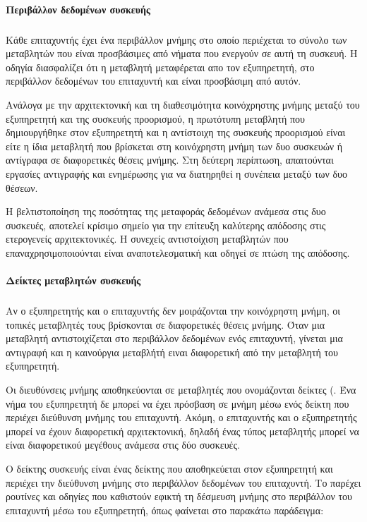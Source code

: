 \paragraph{Περιβάλλον δεδομένων συσκευής}
\subparagraph{}
Κάθε επιταχυντής έχει ένα περιβάλλον μνήμης στο οποίο περιέχεται το σύνολο των μεταβλητών που είναι προσβάσιμες από νήματα που ενεργούν σε αυτή τη συσκευή. Η οδηγία \emph{} διασφαλίζει ότι η μεταβλητή μεταφέρεται απο τον εξυπηρετητή, στο περιβάλλον δεδομένων του επιταχυντή και είναι προσβάσιμη από αυτόν.

Ανάλογα με την αρχιτεκτονική και τη διαθεσιμότητα κοινόχρηστης μνήμης μεταξύ του εξυπηρετητή \emph{} και της συσκευής προορισμού, η πρωτότυπη μεταβλητή που δημιουργήθηκε στον εξυπηρετητή και η αντίστοιχη της συσκευής προορισμού είναι είτε η ίδια μεταβλητή που βρίσκεται στη κοινόχρηστη μνήμη των δυο συσκευών ή αντίγραφα σε διαφορετικές θέσεις μνήμης. Στη δεύτερη περίπτωση, απαιτούνται εργασίες αντιγραφής και ενημέρωσης για να διατηρηθεί η συνέπεια μεταξύ των δυο θέσεων.

Η βελτιστοποίηση της ποσότητας της μεταφοράς δεδομένων ανάμεσα στις δυο συσκευές, αποτελεί κρίσιμο σημείο για την επίτευξη καλύτερης απόδοσης στις ετερογενείς αρχιτεκτονικές.
Η συνεχείς αντιστοίχιση μεταβλητών που επαναχρησιμοποιούνται είναι αναποτελεσματική και οδηγεί σε πτώση της απόδοσης.

\paragraph{Δείκτες μεταβλητών συσκευής}
\subparagraph{}
Αν ο εξυπηρετητής και ο επιταχυντής δεν μοιράζονται την κοινόχρηστη μνήμη, οι τοπικές μεταβλητές τους βρίσκονται σε διαφορετικές θέσεις μνήμης. Όταν μια μεταβλητή αντιστοιχίζεται στο περιβάλλον δεδομένων ενός επιταχυντή, γίνεται μια αντιγραφή και η καινούργια μεταβλήτή ειναι διαφορετική από την μεταβλητή του εξυπηρετητή.

Οι διευθύνσεις μνήμης αποθηκεύονται σε μεταβλητές που ονομάζονται δείκτες (\emph{}. Ένα νήμα του εξυπηρετητή δε μπορεί να έχει πρόσβαση σε μνήμη μέσω ενός δείκτη που περιέχει διεύθυνση μνήμης του επιταχυντή. Ακόμη, ο επιταχυντής και ο εξυπηρετητής μπορεί να έχουν διαφορετική αρχιτεκτονική, δηλαδή ένας τύπος μεταβλητής μπορεί να είναι διαφορετικού μεγέθους ανάμεσα στις δύο συσκευές.

Ο δείκτης συσκευής \emph{} είναι ένας δείκτης που αποθηκεύεται στον εξυπηρετητή και περιέχει την διεύθυνση μνήμης στο περιβάλλον δεδομένων του επιταχυντή. Το \emph{} παρέχει ρουτίνες και οδηγίες που καθιστούν εφικτή τη δέσμευση μνήμης στο περιβάλλον του επιταχυντή μέσω του εξυπηρετητή, όπως φαίνεται στο παρακάτω παράδειγμα:


